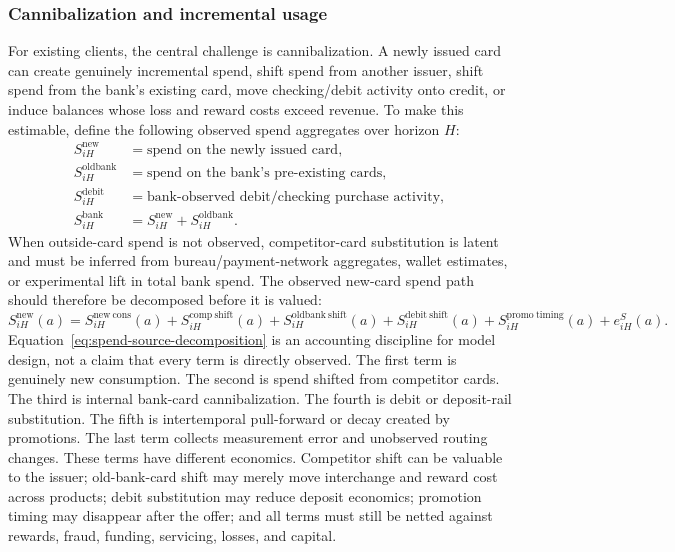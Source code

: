 \documentclass[11pt]{article}
\newcommand{\1}{\mathbf{1}}
\begin{document}
\subsubsection{Cannibalization and incremental usage}

For existing clients, the central challenge is cannibalization. A newly issued
card can create genuinely incremental spend, shift spend from another issuer,
shift spend from the bank's existing card, move checking/debit activity onto
credit, or induce balances whose loss and reward costs exceed revenue. To make
this estimable, define the following observed spend aggregates over horizon
$H$:
\begin{align}
  S^{\mathrm{new}}_{iH}
    &= \text{spend on the newly issued card}, \\
  S^{\mathrm{oldbank}}_{iH}
    &= \text{spend on the bank's pre-existing cards}, \\
  S^{\mathrm{debit}}_{iH}
    &= \text{bank-observed debit/checking purchase activity}, \\
  S^{\mathrm{bank}}_{iH}
    &= S^{\mathrm{new}}_{iH}+S^{\mathrm{oldbank}}_{iH}.
\end{align}
When outside-card spend is not observed, competitor-card substitution is latent
and must be inferred from bureau/payment-network aggregates, wallet estimates,
or experimental lift in total bank spend. The observed new-card spend path
should therefore be decomposed before it is valued:
\begin{equation}
  S^{\mathrm{new}}_{iH}(a)
  =
  S^{\mathrm{new\ cons}}_{iH}(a)
  + S^{\mathrm{comp\ shift}}_{iH}(a)
  + S^{\mathrm{oldbank\ shift}}_{iH}(a)
  + S^{\mathrm{debit\ shift}}_{iH}(a)
  + S^{\mathrm{promo\ timing}}_{iH}(a)
  + e^{S}_{iH}(a).
  \label{eq:spend-source-decomposition}
\end{equation}
Equation~\eqref{eq:spend-source-decomposition} is an accounting discipline for
model design, not a claim that every term is directly observed. The first term
is genuinely new consumption. The second is spend shifted from competitor
cards. The third is internal bank-card cannibalization. The fourth is debit or
deposit-rail substitution. The fifth is intertemporal pull-forward or decay
created by promotions. The last term collects measurement error and unobserved
routing changes. These terms have different economics. Competitor shift can be
valuable to the issuer; old-bank-card shift may merely move interchange and
reward cost across products; debit substitution may reduce deposit economics;
promotion timing may disappear after the offer; and all terms must still be
netted against rewards, fraud, funding, servicing, losses, and capital.
\end{document}
